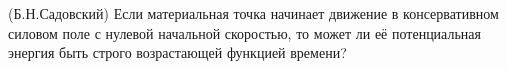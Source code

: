 (Б.Н.Садовский)
Если материальная точка начинает движение в консервативном силовом
поле с нулевой начальной скоростью, то может ли её потенциальная энергия
быть строго возрастающей функцией времени?
